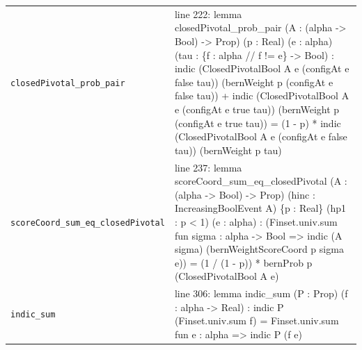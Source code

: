 \documentclass[10pt]{article}
\begin{document}
\begin{longtable}{>{\raggedright\arraybackslash}p{} >{\raggedright\arraybackslash}p{}}
\texttt{closedPivotal\_\allowbreak{}prob\_\allowbreak{}pair} & {\ttfamily\scriptsize line 222:\allowbreak{} lemma closedPivotal\_\allowbreak{}prob\_\allowbreak{}pair (\allowbreak{}A :\allowbreak{} (\allowbreak{}alpha -\allowbreak{}> Bool)\allowbreak{} -\allowbreak{}> Prop)\allowbreak{} (\allowbreak{}p :\allowbreak{} Real)\allowbreak{} (\allowbreak{}e :\allowbreak{} alpha)\allowbreak{} (\allowbreak{}tau :\allowbreak{} \{f :\allowbreak{} alpha /\allowbreak{}/\allowbreak{} f !=\allowbreak{} e\} -\allowbreak{}> Bool)\allowbreak{} :\allowbreak{} indic (\allowbreak{}ClosedPivotalBool A e (\allowbreak{}configAt e false tau)\allowbreak{})\allowbreak{} (\allowbreak{}bernWeight p (\allowbreak{}configAt e false tau)\allowbreak{})\allowbreak{} +\allowbreak{} indic (\allowbreak{}ClosedPivotalBool A e (\allowbreak{}configAt e true tau)\allowbreak{})\allowbreak{} (\allowbreak{}bernWeight p (\allowbreak{}configAt e true tau)\allowbreak{})\allowbreak{} =\allowbreak{} (\allowbreak{}1 -\allowbreak{} p)\allowbreak{} *\allowbreak{} indic (\allowbreak{}ClosedPivotalBool A e (\allowbreak{}configAt e false tau)\allowbreak{})\allowbreak{} (\allowbreak{}bernWeight p tau)\allowbreak{}} \\[0.45em]
\texttt{scoreCoord\_\allowbreak{}sum\_\allowbreak{}eq\_\allowbreak{}closedPivotal} & {\ttfamily\scriptsize line 237:\allowbreak{} lemma scoreCoord\_\allowbreak{}sum\_\allowbreak{}eq\_\allowbreak{}closedPivotal (\allowbreak{}A :\allowbreak{} (\allowbreak{}alpha -\allowbreak{}> Bool)\allowbreak{} -\allowbreak{}> Prop)\allowbreak{} (\allowbreak{}hinc :\allowbreak{} IncreasingBoolEvent A)\allowbreak{} \{p :\allowbreak{} Real\} (\allowbreak{}hp1 :\allowbreak{} p < 1)\allowbreak{} (\allowbreak{}e :\allowbreak{} alpha)\allowbreak{} :\allowbreak{} (\allowbreak{}Finset.\allowbreak{}univ.\allowbreak{}sum fun sigma :\allowbreak{} alpha -\allowbreak{}> Bool =\allowbreak{}> indic (\allowbreak{}A sigma)\allowbreak{} (\allowbreak{}bernWeightScoreCoord p sigma e)\allowbreak{})\allowbreak{} =\allowbreak{} (\allowbreak{}1 /\allowbreak{} (\allowbreak{}1 -\allowbreak{} p)\allowbreak{})\allowbreak{} *\allowbreak{} bernProb p (\allowbreak{}ClosedPivotalBool A e)\allowbreak{}} \\[0.45em]
\texttt{indic\_\allowbreak{}sum} & {\ttfamily\scriptsize line 306:\allowbreak{} lemma indic\_\allowbreak{}sum (\allowbreak{}P :\allowbreak{} Prop)\allowbreak{} (\allowbreak{}f :\allowbreak{} alpha -\allowbreak{}> Real)\allowbreak{} :\allowbreak{} indic P (\allowbreak{}Finset.\allowbreak{}univ.\allowbreak{}sum f)\allowbreak{} =\allowbreak{} Finset.\allowbreak{}univ.\allowbreak{}sum fun e :\allowbreak{} alpha =\allowbreak{}> indic P (\allowbreak{}f e)\allowbreak{}} \\[0.45em]

\end{longtable}
\end{document}
